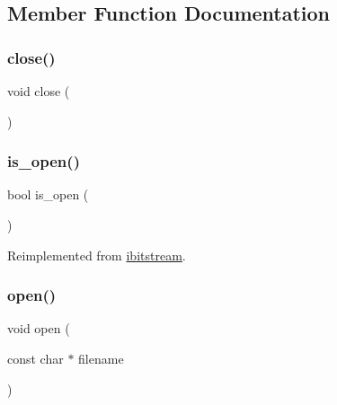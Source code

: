 \subsection{Member Function Documentation}
\mbox{\label{classifbitstream_a5ae591df94fc66ccb85cbb6565368bca}} 
\subsubsection{\texorpdfstring{close()}{close()}}
{\footnotesize\ttfamily void close (\begin{DoxyParamCaption}{ }\end{DoxyParamCaption})}

\mbox{\label{classifbitstream_a2f57f54d8c03b615bb31eee091d8a88a}} 
\subsubsection{\texorpdfstring{is\+\_\+open()}{is\_open()}}
{\footnotesize\ttfamily bool is\+\_\+open (\begin{DoxyParamCaption}{ }\end{DoxyParamCaption})\hspace{0.3cm}{\ttfamily [virtual]}}



Reimplemented from \mbox{\hyperlink{classibitstream_a2f57f54d8c03b615bb31eee091d8a88a}{ibitstream}}.

\mbox{\label{classifbitstream_a57f80da790b202b27353cd8f8415b382}} 
\subsubsection{\texorpdfstring{open()}{open()}\hspace{0.1cm}{\footnotesize\ttfamily [1/2]}}
{\footnotesize\ttfamily void open (\begin{DoxyParamCaption}\item[{const char $\ast$}]{filename }\end{DoxyParamCaption})}

\mbox{\label{classifbitstream_a72f6f3d1b9bc5a4275359cc0a83a60bd}} 
